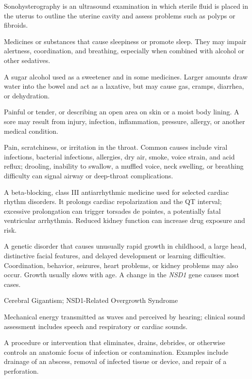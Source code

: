  Sonohysterography is an ultrasound examination in which sterile fluid is placed in the uterus to outline the uterine cavity and assess problems such as polyps or fibroids.

 Medicines or substances that cause sleepiness or promote sleep. They may impair alertness, coordination, and breathing, especially when combined with alcohol or other sedatives.

 A sugar alcohol used as a sweetener and in some medicines. Larger amounts draw water into the bowel and act as a laxative, but may cause gas, cramps, diarrhea, or dehydration.

 Painful or tender, or describing an open area on skin or a moist body lining. A sore may result from injury, infection, inflammation, pressure, allergy, or another medical condition.

 Pain, scratchiness, or irritation in the throat. Common causes include viral infections, bacterial infections, allergies, dry air, smoke, voice strain, and acid reflux; drooling, inability to swallow, a muffled voice, neck swelling, or breathing difficulty can signal airway or deep-throat complications.

 A beta-blocking, class III antiarrhythmic medicine used for selected cardiac rhythm
disorders. It prolongs cardiac repolarization and the QT interval; excessive prolongation can trigger
torsades de pointes, a potentially fatal ventricular arrhythmia. Reduced kidney function can increase
drug exposure and risk.

 A genetic disorder that causes unusually rapid growth in childhood, a large head, distinctive facial features, and delayed development or learning difficulties. Coordination, behavior, seizures, heart problems, or kidney problems may also occur. Growth usually slows with age. A change in the \textit{NSD1} gene causes most cases.

\synonyms
Cerebral Gigantism; NSD1-Related Overgrowth Syndrome

 Mechanical energy transmitted as waves and perceived by hearing; clinical sound assessment includes speech and respiratory or cardiac sounds.

 A procedure or intervention that eliminates, drains, debrides, or otherwise controls an
anatomic focus of infection or contamination. Examples include drainage of an abscess,
removal of infected tissue or device, and repair of a perforation.

